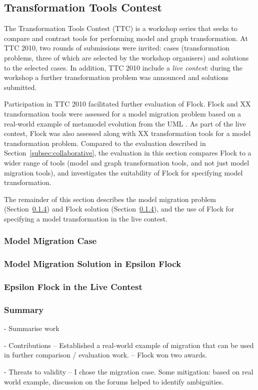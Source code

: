 
\subsection{Transformation Tools Contest}
The Transformation Tools Contest (TTC) is a workshop series that seeks to compare and contrast tools for performing model and graph transformation. At TTC 2010, two rounds of submissions were invited: cases (transformation problems, three of which are selected by the workshop organisers) and solutions to the selected cases. In addition, TTC 2010 include a \emph{live contest}: during the workshop a further transformation problem was announced and solutions submitted.

Participation in TTC 2010 facilitated further evaluation of Flock. Flock and XX transformation tools were assessed for a model migration problem based on a real-world example of metamodel evolution from the UML \cite{uml21}. As part of the live contest, Flock was also assessed along with XX transformation tools for a model transformation problem. Compared to the evaluation described in Section~\ref{subsec:collaborative}, the evaluation in this section compares Flock to a wider range of tools (model and graph transformation tools, and not just model migration tools), and investigates the suitability of Flock for specifying model transformation.

The remainder of this section describes the model migration problem (Section~\ref{}) and Flock solution (Section~\ref{}), and the use of Flock for specifying a model transformation in the live contest.

\subsubsection{Model Migration Case}

\subsubsection{Model Migration Solution in Epsilon Flock}

\subsubsection{Epsilon Flock in the Live Contest}


\subsubsection{Summary}
- Summarise work

- Contributions
-- Established a real-world example of migration that can be used in further comparison / evaluation work.
-- Flock won two awards.

- Threats to validity
-- I chose the migration case. Some mitigation: based on real world example, discussion on the forums helped to identify ambiguities. 


